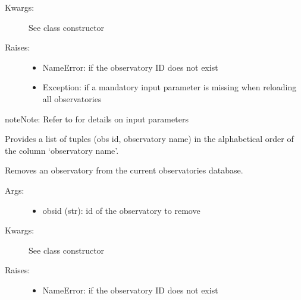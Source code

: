\documentclass[letterpaper,10pt,english]{sphinxmanual}
\begin{document}
\begin{fulllineitems}
\begin{fulllineitems}
\begin{description}
\begin{itemize}
\end{itemize}

\item[{Kwargs:}] \leavevmode
See class constructor

\item[{Raises:}] \leavevmode\begin{itemize}
\item {} 
NameError: if the observatory ID does not exist

\item {} 
Exception: if a mandatory input parameter is missing when reloading all observatories

\end{itemize}

\end{description}

\begin{notice}{note}{Note:}
Refer to  for details on input parameters
\end{notice}

\end{fulllineitems}


\begin{fulllineitems}
\label{astroobs:astroobs.ObservatoryList.nameList}
Provides a list of tuples (obs id, observatory name) in the alphabetical order of the column `observatory name'.

\end{fulllineitems}


\begin{fulllineitems}
\label{astroobs:astroobs.ObservatoryList.rem}
Removes an observatory from the current observatories database.
\begin{description}
\item[{Args:}] \leavevmode\begin{itemize}
\item {} 
obsid (str): id of the observatory to remove

\end{itemize}

\item[{Kwargs:}] \leavevmode
See class constructor

\item[{Raises:}] \leavevmode\begin{itemize}
\item {} 
NameError: if the observatory ID does not exist


\end{itemize}
\end{description}
\end{fulllineitems}
\end{fulllineitems}
\end{document}
